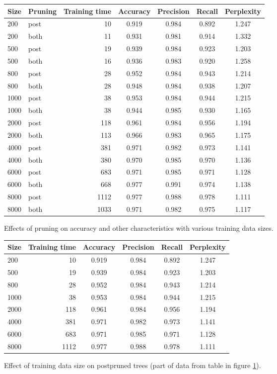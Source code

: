 \documentclass[a4paper,10pt]{article}
\begin{document}
\begin{figure}
  \centering
\begin{tabular}{|l|l|r|c|c|c|c|}
\hline
Size & Pruning & Training time & Accuracy & Precision & Recall &
Perplexity \\ \hline 
200 & post & 10 & 0.919 & 0.984 & 0.892 & 1.247 \\
200 & both & 11 & 0.931 & 0.981 & 0.914 & 1.332 \\
500 & post & 19 & 0.939 & 0.984 & 0.923 & 1.203 \\
500 & both & 16 & 0.936 & 0.983 & 0.920 & 1.258 \\
800 & post & 28 & 0.952 & 0.984 & 0.943 & 1.214 \\
800 & both & 28 & 0.948 & 0.984 & 0.938 & 1.207 \\
1000 & post & 38 & 0.953 & 0.984 & 0.944 & 1.215 \\
1000 & both & 38 & 0.944 & 0.985 & 0.930 & 1.165 \\
2000 & post & 118 & 0.961 & 0.984 & 0.956 & 1.194 \\
2000 & both & 113 & 0.966 & 0.983 & 0.965 & 1.175 \\
4000 & post & 381 & 0.971 & 0.982 & 0.973 & 1.141 \\
4000 & both & 380 & 0.970 & 0.985 & 0.970 & 1.136 \\
6000 & post & 683 & 0.971 & 0.985 & 0.971 & 1.128 \\
6000 & both & 668 & 0.977 & 0.991 & 0.974 & 1.138 \\
8000 & post & 1112 & 0.977 & 0.988 & 0.978 & 1.111 \\
8000 & both & 1033 & 0.971 & 0.982 & 0.975 & 1.117 \\
\hline
\end{tabular}
  \caption{Effects of pruning on accuracy and other characteristics with
    various training data sizes.}
  \label{tbl:classifiers} 
\end{figure}

\begin{figure}
  \centering
\begin{tabular}{|l|r|c|c|c|c|}
\hline
Size & Training time & Accuracy & Precision & Recall &
Perplexity \\ \hline 
200  & 10 & 0.919 & 0.984 & 0.892 & 1.247 \\
500  & 19 & 0.939 & 0.984 & 0.923 & 1.203 \\
800  & 28 & 0.952 & 0.984 & 0.943 & 1.214 \\
1000 & 38 & 0.953 & 0.984 & 0.944 & 1.215 \\
2000 & 118 & 0.961 & 0.984 & 0.956 & 1.194 \\
4000 & 381 & 0.971 & 0.982 & 0.973 & 1.141 \\
6000 & 683 & 0.971 & 0.985 & 0.971 & 1.128 \\
8000 & 1112 & 0.977 & 0.988 & 0.978 & 1.111 \\
\hline
\end{tabular}
  \caption{Effect of training data size on postpruned trees (part of
    data from table in figure \ref{tbl:classifiers}).}
  \label{tbl:classifiers-postpruned} 
\end{figure}
\end{document}
